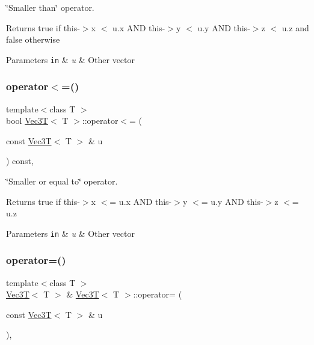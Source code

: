 \char`\"{}\+Smaller than\char`\"{} operator. 

Returns true if this-\/$>$x $<$ u.\+x A\+ND this-\/$>$y $<$ u.\+y A\+ND this-\/$>$z $<$ u.\+z and false otherwise 
\begin{DoxyParams}[1]{Parameters}
\mbox{\tt in}  & {\em u} & Other vector \\
\hline
\end{DoxyParams}
\mbox{\label{classVec3T_a266a34a83b9f23a391151be45a4e39f8}} 
\subsubsection{\texorpdfstring{operator$<$=()}{operator<=()}}
{\footnotesize\ttfamily template$<$class T $>$ \\
bool \hyperlink{classVec3T}{Vec3T}$<$ T $>$\+::operator$<$= (\begin{DoxyParamCaption}\item[{const \hyperlink{classVec3T}{Vec3T}$<$ T $>$ \&}]{u }\end{DoxyParamCaption}) const\hspace{0.3cm}{\ttfamily [inline]}, {\ttfamily [noexcept]}}



\char`\"{}\+Smaller or equal to\char`\"{} operator. 

Returns true if this-\/$>$x $<$= u.\+x A\+ND this-\/$>$y $<$= u.\+y A\+ND this-\/$>$z $<$= u.\+z 
\begin{DoxyParams}[1]{Parameters}
\mbox{\tt in}  & {\em u} & Other vector \\
\hline
\end{DoxyParams}
\mbox{\label{classVec3T_a34681a81b55b4e7ae818e01b5f27a3e0}} 
\subsubsection{\texorpdfstring{operator=()}{operator=()}}
{\footnotesize\ttfamily template$<$class T $>$ \\
\hyperlink{classVec3T}{Vec3T}$<$ T $>$ \& \hyperlink{classVec3T}{Vec3T}$<$ T $>$\+::operator= (\begin{DoxyParamCaption}\item[{const \hyperlink{classVec3T}{Vec3T}$<$ T $>$ \&}]{u }\end{DoxyParamCaption})\hspace{0.3cm}{\ttfamily [inline]}, {\ttfamily [noexcept]}}



